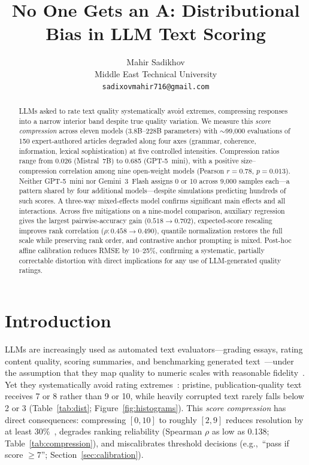\documentclass[11pt]{article}
\title{No One Gets an A: Distributional Bias in LLM Text Scoring}
\author{Mahir Sadikhov \\
  Middle East Technical University \\
  \texttt{sadixovmahir716@gmail.com}
}
\newcommand{\eg}{e.g.,\ }
\begin{document}
\maketitle
\begin{abstract}
LLMs asked to rate text quality systematically avoid extremes,
compressing responses into a narrow interior band despite true quality
variation. We measure this \emph{score compression} across eleven
models (3.8B--228B parameters) with $\sim$99{,}000 evaluations of 150
expert-authored articles degraded along four axes (grammar, coherence,
information, lexical sophistication) at five controlled intensities.
Compression ratios range from 0.026 (Mistral~7B) to 0.685
(GPT-5~mini), with a positive size--compression correlation among nine
open-weight models (Pearson $r = 0.78$, $p = 0.013$). Neither
GPT-5~mini nor Gemini~3~Flash assigns 0 or 10 across 9{,}000 samples
each---a pattern shared by four additional models---despite simulations
predicting hundreds of such scores. A three-way mixed-effects model
confirms significant main effects and all interactions. Across five
mitigations on a nine-model comparison, auxiliary regression gives the
largest pairwise-accuracy gain ($0.518 \to 0.702$), expected-score
rescaling improves rank correlation ($\rho\colon 0.458 \to 0.490$),
quantile normalization restores the full scale while preserving rank
order, and contrastive anchor prompting is mixed. Post-hoc affine
calibration reduces RMSE by 10--25\%, confirming a systematic,
partially correctable distortion with direct implications for any use
of LLM-generated quality ratings.
\end{abstract}
\section{Introduction}
\label{sec:intro}

LLMs are increasingly used as automated text evaluators---grading
essays, rating content quality, scoring summaries, and benchmarking
generated text~\citep{zheng2023judging,liu2023geval,kocmi2023large}---under
the assumption that they map quality to numeric scales with reasonable
fidelity~\citep{zheng2023judging,liu2023geval}. Yet they systematically
avoid rating extremes~\citep{zheng2023judging,liu2023geval}: pristine,
publication-quality text receives 7 or 8 rather than 9 or 10, while
heavily corrupted text rarely falls below 2 or 3 (Table~\ref{tab:dist};
Figure~\ref{fig:histograms}). This \emph{score compression} has direct
consequences: compressing $[0,10]$ to roughly $[2,9]$ reduces
resolution by at least 30\%~\citep{zheng2023judging,liu2023geval},
degrades ranking reliability (Spearman $\rho$ as low as 0.138;
Table~\ref{tab:compression}), and miscalibrates threshold decisions
(\eg ``pass if score $\geq 7$''; Section~\ref{sec:calibration}).
\end{document}
